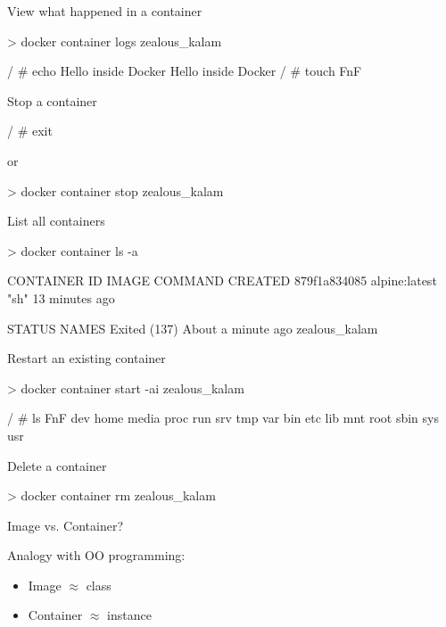 \documentclass{beamer}
\renewcommand\big[1]{
  \begin{center}
    \Large{#1}
  \end{center}
}
\begin{document}
\begin{frame}[fragile]
  \big{View what happened in a container}
  \begin{mylisting}
    > docker container logs zealous_kalam

    / # echo Hello inside Docker
    Hello inside Docker
    / # touch FnF
  \end{mylisting}
\end{frame}

\begin{frame}[fragile]
  \big{Stop a container}
  \begin{mylisting}
    / # exit
  \end{mylisting}
  or
  \begin{mylisting}
    > docker container stop zealous_kalam
  \end{mylisting}
\end{frame}

\begin{frame}[fragile]
  \big{List all containers}
  \begin{mylisting}
> docker container ls -a

CONTAINER ID    IMAGE            COMMAND   CREATED
879f1a834085    alpine:latest    "sh"      13 minutes ago

STATUS                                 NAMES
Exited (137) About a minute ago        zealous_kalam

  \end{mylisting}
\end{frame}

\begin{frame}[fragile]
  \big{Restart an existing container}
  \begin{mylisting}
> docker container start -ai zealous_kalam

/ # ls
FnF    dev    home   media  proc   run    srv    tmp    var
bin    etc    lib    mnt    root   sbin   sys    usr
  \end{mylisting}
\end{frame}

\begin{frame}[fragile]
  \big{Delete a container}
  \begin{mylisting}
    > docker container rm zealous_kalam
  \end{mylisting}
\end{frame}

\begin{frame}[fragile]
  \big{Image vs. Container?}

  Analogy with OO programming:
  \begin{itemize}
    \item Image $\approx$ class
    \item Container $\approx$ instance
  \end{itemize}
\end{frame}
\end{document}
